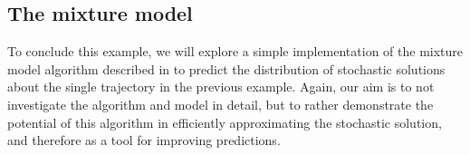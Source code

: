 
\subsection{The mixture model}
To conclude this example, we will explore a simple implementation of the mixture model algorithm described in  to predict the distribution of stochastic solutions about the single trajectory in the previous example.
Again, our aim is to not investigate the algorithm and model in detail, but to rather demonstrate the potential of this algorithm in efficiently approximating the stochastic solution, and therefore as a tool for improving predictions.

